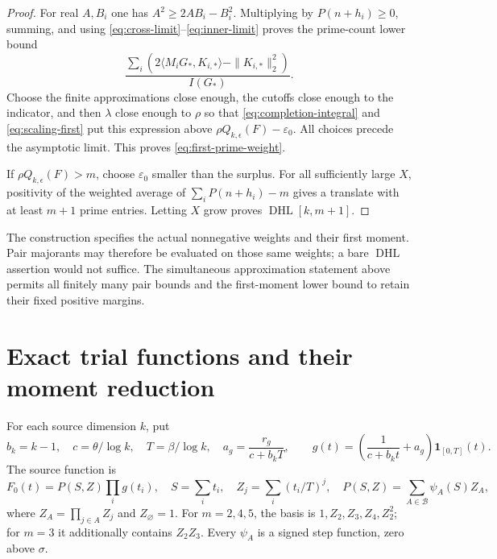 \documentclass[11pt,a4paper]{article}
\theoremstyle{definition}\newtheorem{definition}[theorem]{Definition}
\theoremstyle{remark}\newtheorem{remark}[theorem]{Remark}
\newcommand{\ind}{\mathbf 1}\newcommand{\dd}{\,d}
\newcommand{\DHL}{\operatorname{DHL}}
\numberwithin{equation}{section}
\begin{document}
\begin{proof}
For real $A,B_i$ one has $A^2\ge2AB_i-B_i^2$. Multiplying by $P(n+h_i)\ge0$, summing, and using \eqref{eq:cross-limit}--\eqref{eq:inner-limit} proves the prime-count lower bound
\[
 \frac{\sum_i(2\langle M_iG_*,K_{i,*}\rangle-\|K_{i,*}\|_2^2)}{I(G_*)}.
\]
Choose the finite approximations close enough, the cutoffs close enough to the indicator, and then $\lambda$ close enough to $\rho$ so that \eqref{eq:completion-integral} and \eqref{eq:scaling-first} put this expression above $\rho Q_{k,\epsilon}(F)-\varepsilon_0$. All choices precede the asymptotic limit. This proves \eqref{eq:first-prime-weight}.

If $\rho Q_{k,\epsilon}(F)>m$, choose $\varepsilon_0$ smaller than the surplus. For all sufficiently large $X$, positivity of the weighted average of $\sum_iP(n+h_i)-m$ gives a translate with at least $m+1$ prime entries. Letting $X$ grow proves $\DHL[k,m+1]$.
\end{proof}

The construction specifies the actual nonnegative weights and their first moment. Pair majorants may therefore be evaluated on those same weights; a bare $\DHL$ assertion would not suffice. The simultaneous approximation statement above permits all finitely many pair bounds and the first-moment lower bound to retain their fixed positive margins.

\section{Exact trial functions and their moment reduction}\label{sec:trials}
For each source dimension $k$, put
\begin{equation}\label{eq:g}
 b_k=k-1,\quad c=\theta/\log k,\quad T=\beta/\log k,\quad
 a_g=\frac{r_g}{c+b_kT},\qquad
 g(t)=\left(\frac1{c+b_kt}+a_g\right)\ind_{[0,T]}(t).
\end{equation}
The source function is
\begin{equation}\label{eq:F0}
 F_0(t)=P(S,Z)\prod_i g(t_i),\quad S=\sum_i t_i,\quad
 Z_j=\sum_i(t_i/T)^j,\quad
 P(S,Z)=\sum_{A\in\mathcal B}\psi_A(S)Z_A,
\end{equation}
where $Z_A=\prod_{j\in A}Z_j$ and $Z_\varnothing=1$.
For $m=2,4,5$, the basis is $1,Z_2,Z_3,Z_4,Z_2^2$; for $m=3$ it additionally contains $Z_2Z_3$. Every $\psi_A$ is a signed step function, zero above $\sigma$.
\end{document}
